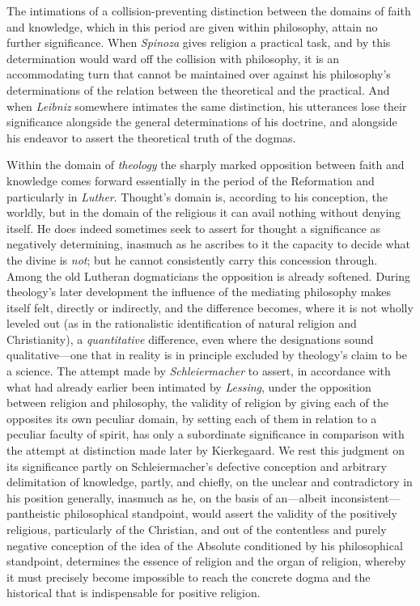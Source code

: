 \documentclass[12pt,a4paper]{book}
\begin{document}
The intimations of a collision-preventing distinction between the domains of
faith and knowledge, which in this period are given within philosophy, attain
no further significance. When \emph{Spinoza} gives religion a practical task, and by
this determination would ward off the collision with philosophy, it is an
accommodating turn that cannot be maintained over against his philosophy's
determinations of the relation between the theoretical and the practical. And
when \emph{Leibniz} somewhere intimates the same distinction, his utterances lose
their significance alongside the general determinations of his doctrine, and
alongside his endeavor to assert the theoretical truth of the dogmas.

Within the domain of \emph{theology} the sharply marked opposition between faith and
knowledge comes forward essentially in the period of the Reformation and
particularly in \emph{Luther}. Thought's domain is, according to his conception, the
worldly, but in the domain of the religious it can avail nothing without
denying itself. He does indeed sometimes seek to assert for thought a
significance as negatively determining, inasmuch as he ascribes to it the
capacity to decide what the divine is \emph{not}; but he cannot consistently carry
this concession through. Among the old Lutheran dogmaticians the opposition is
already softened. During theology's later development the influence of the
mediating philosophy makes itself felt, directly or indirectly, and the
difference becomes, where it is not wholly leveled out (as in the
rationalistic identification of natural religion and Christianity), a
\emph{quantitative} difference, even where the designations sound qualitative---one
that in reality is in principle excluded by theology's claim to be a science.
The attempt made by \emph{Schleiermacher} to assert, in accordance with what had
already earlier been intimated by \emph{Lessing}, under the opposition between
religion and philosophy, the validity of religion by giving each of the
opposites its own peculiar domain, by setting each of them in relation to a
peculiar faculty of spirit, has only a subordinate significance in comparison
with the attempt at distinction made later by Kierkegaard. We rest this
judgment on its significance partly on Schleiermacher's defective conception
and arbitrary delimitation of knowledge, partly, and chiefly, on the unclear
and contradictory in his position generally, inasmuch as he, on the basis of
an---albeit inconsistent---pantheistic philosophical standpoint, would assert
the validity of the positively religious, particularly of the Christian, and
out of the contentless and purely negative conception of the idea of the
Absolute conditioned by his philosophical standpoint, determines the essence
of religion and the organ of religion, whereby it must precisely become
impossible to reach the concrete dogma and the historical that is
indispensable for positive religion.
\end{document}
